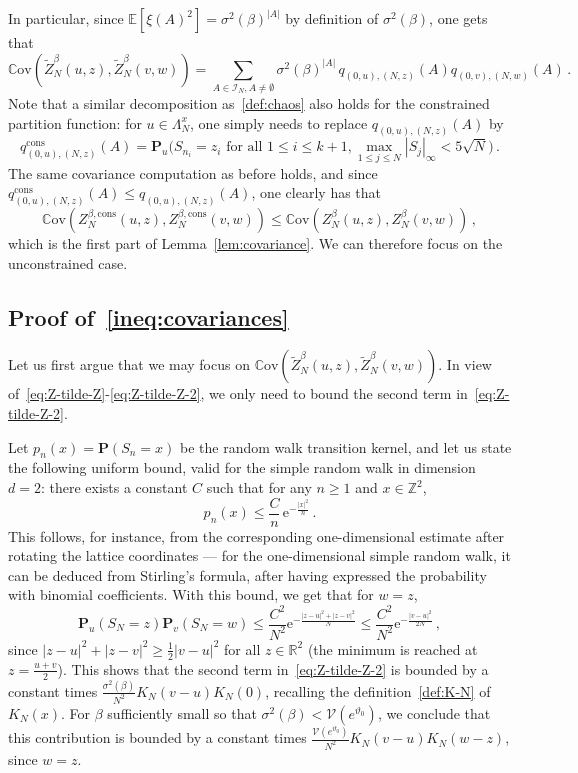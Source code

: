 \documentclass[11pt]{amsart}
\numberwithin{equation}{section}
\newcommand*{\EE}{\mathbb{E}}
\newcommand*{\bP}{\mathbf{P}}
\newcommand*{\numberset}{\mathbb}
\newcommand*{\Z}{\numberset{Z}}
\newcommand*{\R}{\numberset{R}}
\newcommand{\e}{\mathrm{e}}
\newcommand*{\Cov}{\mathbb{C}\mathrm{ov}}
\theoremstyle{plain}
\theoremstyle{definition}
\theoremstyle{remark}
\begin{document}
In particular, since \(\EE[\xi(A)^2] = \sigma^2(\beta)^{|A|}\) by definition of \(\sigma^2(\beta)\), one gets that 
\begin{equation}
       \label{formula-covariance}
       \Cov(\tilde Z_N^{\beta}(u,z), \tilde Z_N^{\beta}(v,w)) 
       = \sum_{A \in  \mathcal{I}_{N}, A\neq \emptyset} \sigma^2(\beta)^{|A|} \, q_{(0,u),(N,z)}(A)  q_{(0,v),(N,w)}(A) \, .
\end{equation}
Note that a similar decomposition as~\eqref{def:chaos} also holds for the constrained partition function: for \(u\in \Lambda_N^x\), one simply needs to replace \(q_{(0,u),(N,z)}(A)\) by
\[
q_{(0,u),(N,z)}^{\mathrm{cons}}(A) = \bP_u \big( S_{n_i}=z_i \text{ for all } 1\leq i\leq k+1 , \max_{1\leq j \leq N} |S_j|_\infty < 5 \sqrt{N}\big) \,.
\]
The same covariance computation as before holds, and since \( q_{(0,u),(N,z)}^{\mathrm{cons}}(A) \leq  q_{(0,u),(N,z)}(A)\), one clearly has that
\[
\Cov(Z_N^{\beta,\mathrm{cons}}(u,z), Z_N^{\beta,\mathrm{cons}}(v,w))  \leq \Cov(Z_N^{\beta}(u,z), Z_N^{\beta}(v,w)) \,,
\]
which is the first part of Lemma~\ref{lem:covariance}.
We can therefore focus on the unconstrained case.






\subsection{Proof of~\texorpdfstring{\eqref{ineq:covariances}}{}}


Let us first argue that we may focus on \(\Cov(\tilde Z_N^{\beta}(u,z), \tilde Z_N^{\beta}(v,w))\).
In view of~\eqref{eq:Z-tilde-Z}-\eqref{eq:Z-tilde-Z-2}, we only need to bound the second term in~\eqref{eq:Z-tilde-Z-2}.

Let \(p_n(x) = \bP(S_n=x)\) be the random walk transition kernel, and let us state the following uniform bound, valid for the simple random walk in dimension \(d=2\): there exists a constant \(C\) such that for any \(n\geq 1\) and \(x\in \Z^2\),
\begin{equation}
       \label{eq:bound-SRW}
       p_n(x) \leq \frac{C}{n} \,\e^{-\frac{|x|^2}{n}} \,.
\end{equation}
This follows, for instance, from the corresponding one-dimensional estimate after rotating the lattice coordinates --- for the one-dimensional simple random walk, it can be deduced from Stirling's formula, after having expressed the probability with binomial coefficients.
With this bound, we get that for \(w=z\),
\[
       \bP_u(S_N=z) \bP_v(S_N=w) \leq  \frac{C^2}{N^2}  \e^{ - \frac{|z-u|^2 + |z-v|^2}{N}} \leq   \frac{C^2}{N^2}  \e^{ - \frac{|v-u|^2}{2N}} \,,
\]
since \(|z-u|^2+|z-v|^2 \geq \frac12 |v-u|^2\) for all \(z\in \R^2\) (the minimum is reached at \(z= \frac{u+v}{2}\)).
This shows that the second term in~\eqref{eq:Z-tilde-Z-2} is bounded by a constant times \(\frac{\sigma^2(\beta)}{N^2} K_N(v-u) K_N(0)\), recalling the definition~\eqref{def:K-N} of \(K_N(x)\). { For $\beta$ sufficiently small so that $\sigma^2(\beta)<\mathcal V(e^{\vartheta_0})$, we conclude that this contribution is bounded by a constant times $\frac{\mathcal V(e^{\vartheta_0})}{N^2}K_N(v-u)K_N(w-z)$, since $w=z$.}
\end{document}

